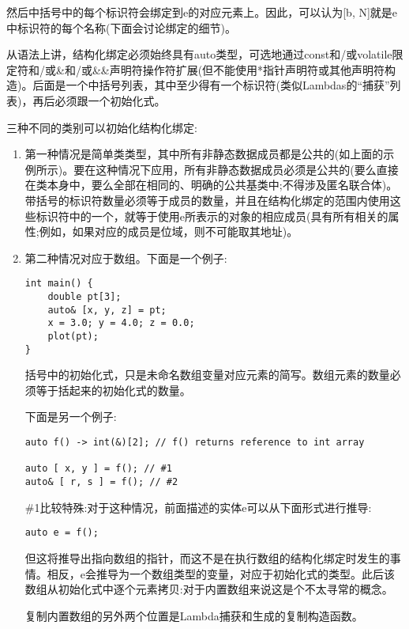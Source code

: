 然后中括号中的每个标识符会绑定到e的对应元素上。因此，可以认为[b, N]就是e中标识符的每个名称(下面会讨论绑定的细节)。

从语法上讲，结构化绑定必须始终具有auto类型，可选地通过const和/或volatile限定符和/或\&和/或\&\&声明符操作符扩展(但不能使用*指针声明符或其他声明符构造)。后面是一个中括号列表，其中至少得有一个标识符(类似Lambdas的“捕获”列表)，再后必须跟一个初始化式。

三种不同的类别可以初始化结构化绑定:

\begin{enumerate}
\item
第一种情况是简单类类型，其中所有非静态数据成员都是公共的(如上面的示例所示)。要在这种情况下应用，所有非静态数据成员必须是公共的(要么直接在类本身中，要么全部在相同的、明确的公共基类中;不得涉及匿名联合体)。带括号的标识符数量必须等于成员的数量，并且在结构化绑定的范围内使用这些标识符中的一个，就等于使用e所表示的对象的相应成员(具有所有相关的属性;例如，如果对应的成员是位域，则不可能取其地址)。

\item
第二种情况对应于数组。下面是一个例子:

\begin{lstlisting}[style=styleCXX]
int main() {
	double pt[3];
	auto& [x, y, z] = pt;
	x = 3.0; y = 4.0; z = 0.0;
	plot(pt);
}
\end{lstlisting}

括号中的初始化式，只是未命名数组变量对应元素的简写。数组元素的数量必须等于括起来的初始化式的数量。

下面是另一个例子:

\begin{lstlisting}[style=styleCXX]
auto f() -> int(&)[2]; // f() returns reference to int array

auto [ x, y ] = f(); // #1
auto& [ r, s ] = f(); // #2
\end{lstlisting}

\#1比较特殊:对于这种情况，前面描述的实体e可以从下面形式进行推导:

\begin{lstlisting}[style=styleCXX]
auto e = f();
\end{lstlisting}

但这将推导出指向数组的指针，而这不是在执行数组的结构化绑定时发生的事情。相反，e会推导为一个数组类型的变量，对应于初始化式的类型。此后该数组从初始化式中逐个元素拷贝:对于内置数组来说这是个不太寻常的概念。

\begin{tcolorbox}[colback=webgreen!5!white,colframe=webgreen!75!black]
\hspace*{0.75cm}复制内置数组的另外两个位置是Lambda捕获和生成的复制构造函数。
\end{tcolorbox}


\end{enumerate}
